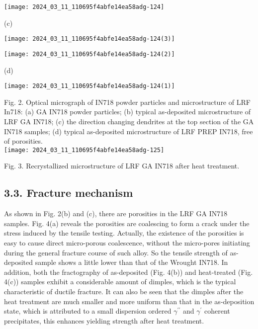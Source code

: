 \documentclass[10pt]{article}
\begin{document}
\begin{center}
\texttt{[image: 2024\_03\_11\_110695f4abfe14ea58adg-124]}
\end{center}

(c)

\begin{center}
\texttt{[image: 2024\_03\_11\_110695f4abfe14ea58adg-124(3)]}
\end{center}

\begin{center}
\texttt{[image: 2024\_03\_11\_110695f4abfe14ea58adg-124(2)]}
\end{center}

(d)

\begin{center}
\texttt{[image: 2024\_03\_11\_110695f4abfe14ea58adg-124(1)]}
\end{center}

Fig. 2. Optical micrograph of IN718 powder particles and microstructure of LRF In718: (a) GA IN718 powder particles; (b) typical as-deposited microstructure of LRF GA IN718; (c) the direction changing dendrites at the top section of the GA IN718 samples; (d) typical as-deposited microstructure of LRF PREP IN718, free of porosities.\\
\texttt{[image: 2024\_03\_11\_110695f4abfe14ea58adg-125]}

Fig. 3. Recrystallized microstructure of LRF GA IN718 after heat treatment.

\subsection*{3.3. Fracture mechanism}
As shown in Fig. 2(b) and (c), there are porosities in the LRF GA IN718 samples. Fig. 4(a) reveals the porosities are coalescing to form a crack under the stress induced by the tensile testing. Actually, the existence of the porosities is easy to cause direct micro-porous coalescence, without the micro-pores initiating during the general fracture course of such alloy. So the tensile strength of as-deposited sample shows a little lower than that of the Wrought IN718. In addition, both the fractography of as-deposited (Fig. 4(b)) and heat-treated (Fig. 4(c)) samples exhibit a considerable amount of dimples, which is the typical characteristic of ductile fracture. It can also be seen that the dimples after the heat treatment are much smaller and more uniform than that in the as-deposition state, which is attributed to a small dispersion ordered $\gamma^{\prime \prime}$ and $\gamma^{\prime}$ coherent precipitates, this enhances yielding strength after heat treatment.
\end{document}
